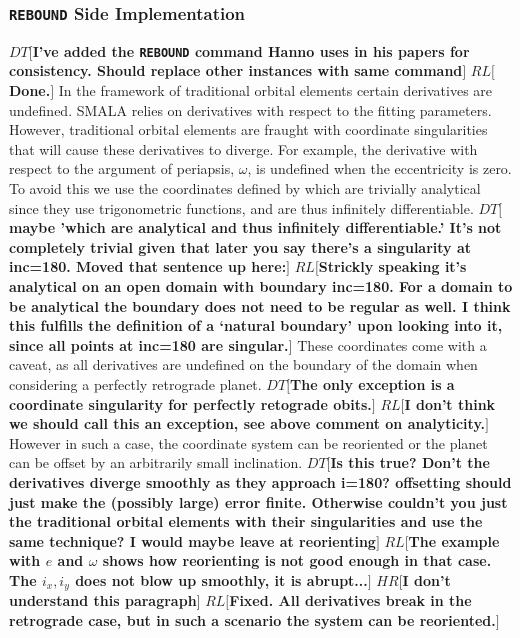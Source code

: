 \documentclass{aa}
\def\memohr#1{\color{blue}$HR[${\bf #1}$]$ \color{black}}
\def\memodt#1{\color{green}$DT[${\bf #1}$]$ \color{black}}
\def\memorl#1{\color{gray}$RL[${\bf #1}$]$ \color{black}}
\newcommand{\reb}{{\sc \tt REBOUND}\xspace}
\begin{document}
\subsubsection{\reb Side Implementation}\label{analytical}
\memodt{I've added the \reb command Hanno uses in his papers for consistency. Should replace other instances with same command}
\memorl{Done.}
In the framework of traditional orbital elements certain derivatives are undefined. SMALA relies on derivatives with respect to the fitting parameters. However, traditional orbital elements are fraught with coordinate singularities that will cause these derivatives to diverge. For example, the derivative with respect to the argument of periapsis, $\omega$, is undefined when the eccentricity is zero. 
To avoid this we use the coordinates defined by \cite{Pl2009} which are trivially analytical since they use trigonometric functions, and are thus infinitely differentiable. \memodt{maybe 'which are analytical and thus infinitely differentiable.' It's not completely trivial given that later you say there's a singularity at inc=180. Moved that sentence up here:}
\memorl{Strickly speaking it's analytical on an open domain with boundary inc=180. For a domain to be analytical the boundary does not need to be regular as well. I think this fulfills the definition of a `natural boundary' upon looking into it, since all points at inc=180 are singular.}
These coordinates come with a caveat, as all derivatives are undefined on the boundary of the domain when considering a perfectly retrograde planet. \memodt{The only exception is a coordinate singularity for perfectly retograde obits.} \memorl{I don't think we should call this an exception, see above comment on analyticity.} However in such a case, the coordinate system can be reoriented or the planet can be offset by an arbitrarily small inclination. \memodt{Is this true? Don't the derivatives diverge smoothly as they approach i=180? offsetting should just make the (possibly large) error finite. Otherwise couldn't you just the traditional orbital elements with their singularities and use the same technique? I would maybe leave at reorienting} \memorl{The example with $e$ and $\omega$ shows how reorienting is not good enough in that case. The $i_x, i_y$ does not blow up smoothly, it is abrupt...}
\memohr{I don't understand this paragraph}
\memorl{Fixed. All derivatives break in the retrograde case, but in such a scenario the system can be reoriented.}
\end{document}
